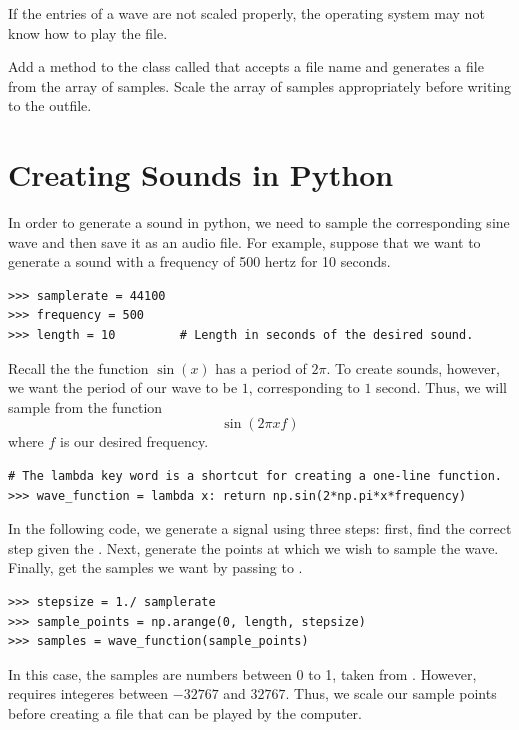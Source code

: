 If the entries of a wave are not scaled properly, the operating system may not know how to play the file.

\begin{problem}
Add a method to the  class called  that accepts a file name and generates a  file from the array of samples.
Scale the array of samples appropriately before writing to the outfile.
\end{problem}

\section*{Creating Sounds in Python}

In order to generate a sound in python, we need to sample the corresponding sine wave and then save it as an audio file.
For example, suppose that we want to generate a sound with a frequency of 500 hertz for 10 seconds.

\begin{lstlisting}
>>> samplerate = 44100
>>> frequency = 500
>>> length = 10         # Length in seconds of the desired sound.
\end{lstlisting}

Recall the the function $\sin(x)$ has a period of $2\pi$.
To create sounds, however, we want the period of our wave to be $1$, corresponding to $1$ second.
Thus, we will sample from the function
\[
\sin(2\pi xf)
\]
where $f$ is our desired frequency.
\begin{lstlisting}
# The lambda key word is a shortcut for creating a one-line function.
>>> wave_function = lambda x: return np.sin(2*np.pi*x*frequency)
\end{lstlisting}

In the following code, we generate a signal using three steps: first, find the correct step given the .
Next, generate the points at which we wish to sample the wave.
Finally, get the samples we want by passing  to .

\begin{lstlisting}
>>> stepsize = 1./ samplerate
>>> sample_points = np.arange(0, length, stepsize)
>>> samples = wave_function(sample_points)
\end{lstlisting}

In this case, the samples are numbers between 0 to 1, taken from .
However,  requires integeres between $-32767$ and $32767$.
Thus, we scale our sample points before creating a  file that can be played by the computer.

